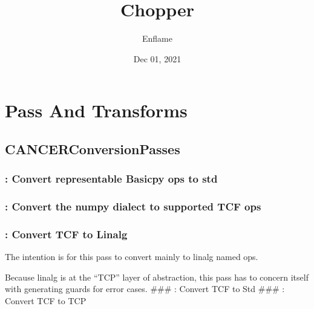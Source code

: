 \documentclass[letterpaper,10pt,english]{sphinxmanual}
\title{Chopper}
\date{Dec 01, 2021}
\author{Enflame}
\begin{document}
\pagestyle{empty}
\sphinxmaketitle
\pagestyle{plain}
\sphinxtableofcontents
\pagestyle{normal}
\label{\detokenize{index::doc}}



\chapter{Pass And Transforms}
\label{\detokenize{Pass_And_Transforms/index:pass-and-transforms}}\label{\detokenize{Pass_And_Transforms/index::doc}}

\section{CANCERConversionPasses}
\label{\detokenize{Pass_And_Transforms/index:cancerconversionpasses}}



\subsection{: Convert representable Basicpy ops to std}
\label{\detokenize{Pass_And_Transforms/index:convert-basicpy-to-std-convert-representable-basicpy-ops-to-std}}

\subsection{: Convert the numpy dialect to supported TCF ops}
\label{\detokenize{Pass_And_Transforms/index:convert-numpy-to-tcf-convert-the-numpy-dialect-to-supported-tcf-ops}}

\subsection{: Convert TCF to Linalg}
\label{\detokenize{Pass_And_Transforms/index:convert-tcf-to-linalg-convert-tcf-to-linalg}}
\sphinxAtStartPar
The intention is for this pass to convert mainly to linalg named ops.

\sphinxAtStartPar
Because linalg is at the “TCP” layer of abstraction, this pass has to
concern itself with generating guards for error cases. \#\#\#
: Convert TCF to Std \#\#\# :
Convert TCF to TCP
\end{document}
